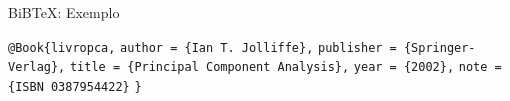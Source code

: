 \begin{frame}{BiB\TeX: Exemplo}

\verb|@Book{livropca,| \newline
\verb|author = {Ian T. Jolliffe},| \newline
\verb|publisher = {Springer-Verlag},| \newline
\verb|title = {Principal Component Analysis},| \newline
\verb|year = {2002},| \newline
\verb|note = {ISBN 0387954422}| \newline
\verb|}| \newline

\cite{latex_wikibooks}

\end{frame} 
